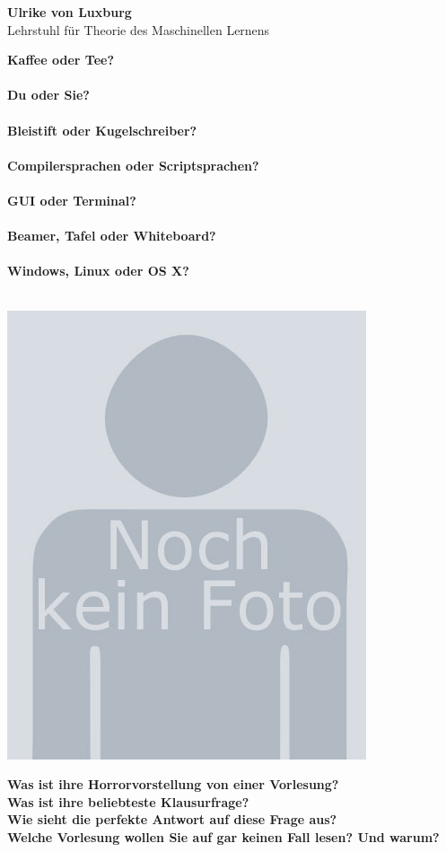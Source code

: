 \Large \textbf{Ulrike von Luxburg}\\
\large Lehrstuhl für Theorie des Maschinellen Lernens\\
\normalsize

\begin{minipage}[h]{0.65\textwidth}
	\textbf{Kaffee oder Tee?}\\
	\\
	\textbf{Du oder Sie?}\\
	\\
	\textbf{Bleistift oder Kugelschreiber?}\\
	\\
	\textbf{Compilersprachen oder Scriptsprachen?}\\
	\\
	\textbf{GUI oder Terminal?}\\
	\\
	\textbf{Beamer, Tafel oder Whiteboard?}\\
	\\
	\textbf{Windows, Linux oder OS X?}\\
	\\
\end{minipage}
\begin{minipage}[h]{0.35\textwidth}
	\includegraphics[width=\textwidth]{content/pictures/no-image.jpeg}
\end{minipage}

\textbf{Was ist ihre Horrorvorstellung von einer Vorlesung?}\\

\textbf{Was ist ihre beliebteste Klausurfrage?}\\

\textbf{Wie sieht die perfekte Antwort auf diese Frage aus?}\\

\textbf{Welche Vorlesung wollen Sie auf gar keinen Fall lesen? Und warum?}
